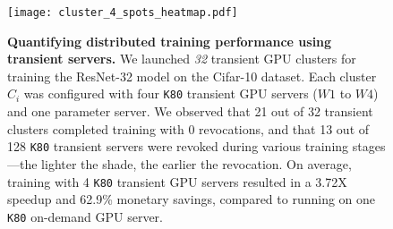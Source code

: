 \begin{figure}[t]
\centering
    \texttt{[image: cluster\_4\_spots\_heatmap.pdf]}
\caption{\textbf{Quantifying distributed training performance using transient
  servers.} We launched \emph{32} transient GPU clusters for training the ResNet-32
  model on the Cifar-10 dataset. Each cluster $C_i$ was configured with four
  \texttt{K80} transient GPU servers ($W1$ to $W4$) and one parameter server.
  We observed that 21 out of 32 transient clusters completed training with 0
  revocations, and that 13 out of 128 \texttt{K80} transient servers were
  revoked during various training stages---the lighter the shade, the earlier
  the revocation. On average, training with 4 \texttt{K80} transient GPU
  servers resulted in a  3.72X speedup and 62.9\% monetary savings, compared to running on one \texttt{K80} on-demand GPU server.}  %
    \label{intro:motivation}
\end{figure}
